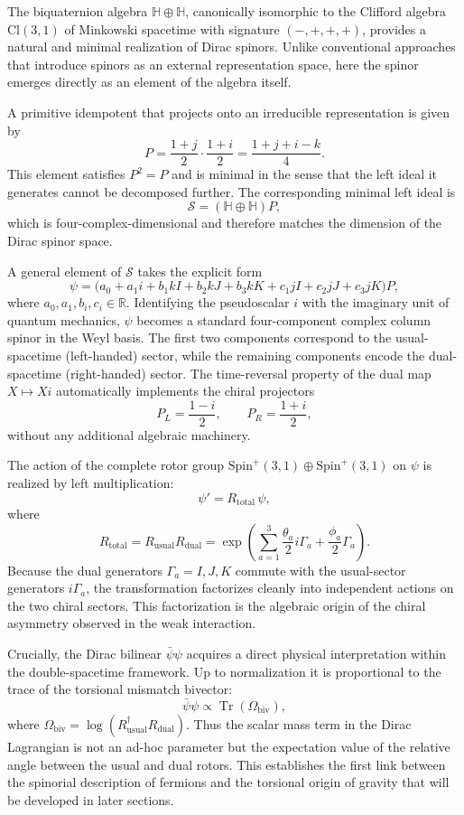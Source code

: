 \documentclass[dvipdfmx,11pt,a4paper]{article}
\begin{document}
The biquaternion algebra $\mathbb{H} \oplus \mathbb{H}$, canonically isomorphic to the Clifford algebra $\mathrm{Cl}(3,1)$ of Minkowski spacetime with signature $(-,+,+,+)$, provides a natural and minimal realization of Dirac spinors. Unlike conventional approaches that introduce spinors as an external representation space, here the spinor emerges directly as an element of the algebra itself.

A primitive idempotent that projects onto an irreducible representation is given by
\[
P = \frac{1+j}{2} \cdot \frac{1+i}{2} = \frac{1 + j + i - k}{4}.
\]
This element satisfies $P^2 = P$ and is minimal in the sense that the left ideal it generates cannot be decomposed further. The corresponding minimal left ideal is
\[
\mathcal{S} = (\mathbb{H} \oplus \mathbb{H}) P,
\]
which is four-complex-dimensional and therefore matches the dimension of the Dirac spinor space.

A general element of $\mathcal{S}$ takes the explicit form
\[
\psi = \bigl( a_0 + a_1 i + b_1 kI + b_2 kJ + b_3 kK + c_1 jI + c_2 jJ + c_3 jK \bigr) P,
\]
where $a_0,a_1,b_i,c_i \in \mathbb{R}$. Identifying the pseudoscalar $i$ with the imaginary unit of quantum mechanics, $\psi$ becomes a standard four-component complex column spinor in the Weyl basis. The first two components correspond to the usual-spacetime (left-handed) sector, while the remaining components encode the dual-spacetime (right-handed) sector. The time-reversal property of the dual map $X \mapsto X i$ automatically implements the chiral projectors
\[
P_L = \frac{1 - i}{2}, \qquad P_R = \frac{1 + i}{2},
\]
without any additional algebraic machinery.

The action of the complete rotor group $\mathrm{Spin}^+(3,1) \oplus \mathrm{Spin}^+(3,1)$ on $\psi$ is realized by left multiplication:
\[
\psi' = R_\text{total} \, \psi,
\]
where
\[
R_\text{total} = R_\text{usual} R_\text{dual} = \exp\left( \sum_{a=1}^3 \frac{\theta_a}{2} i\Gamma_a + \frac{\phi_a}{2} \Gamma_a \right).
\]
Because the dual generators $\Gamma_a = I,J,K$ commute with the usual-sector generators $i\Gamma_a$, the transformation factorizes cleanly into independent actions on the two chiral sectors. This factorization is the algebraic origin of the chiral asymmetry observed in the weak interaction.

Crucially, the Dirac bilinear $\bar{\psi}\psi$ acquires a direct physical interpretation within the double-spacetime framework. Up to normalization it is proportional to the trace of the torsional mismatch bivector:
\[
\bar{\psi}\psi \propto \operatorname{Tr}(\Omega_\text{biv}),
\]
where $\Omega_\text{biv} = \log(R_\text{usual}^\dagger R_\text{dual})$. Thus the scalar mass term in the Dirac Lagrangian is not an ad-hoc parameter but the expectation value of the relative angle between the usual and dual rotors. This establishes the first link between the spinorial description of fermions and the torsional origin of gravity that will be developed in later sections.
\end{document}
